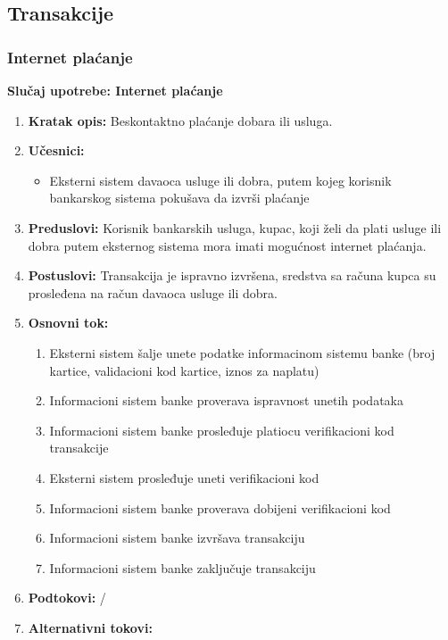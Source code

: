 \documentclass{article}
\begin{document}
\subsection{Transakcije}
\subsubsection{Internet plaćanje}

\textbf{Slučaj upotrebe: Internet plaćanje}
\begin{enumerate}
  \item \textbf{Kratak opis: }
  Beskontaktno plaćanje dobara ili usluga.
  \item \textbf{Učesnici: }
    \begin{itemize}
        \item Eksterni sistem davaoca usluge ili dobra, putem kojeg korisnik bankarskog sistema pokušava da izvrši plaćanje
     \end{itemize}
  \item \textbf{Preduslovi: }
    Korisnik bankarskih usluga, kupac, koji želi da plati usluge ili dobra putem eksternog sistema mora imati mogućnost internet plaćanja. 
  \item \textbf{Postuslovi: }
    Transakcija je ispravno izvršena, sredstva sa računa kupca su prosleđena na račun davaoca usluge ili dobra.
  \item \textbf{Osnovni tok: }
    \begin{enumerate}
      \item Eksterni sistem šalje unete podatke informacinom sistemu banke (broj kartice, validacioni kod kartice, iznos za naplatu)
      \item Informacioni sistem banke proverava ispravnost unetih podataka
      \item Informacioni sistem banke prosleđuje platiocu verifikacioni kod transakcije  
      \item Eksterni sistem prosleđuje uneti verifikacioni kod
      \item Informacioni sistem banke proverava dobijeni verifikacioni kod  
      \item Informacioni sistem banke izvršava transakciju 
      \item Informacioni sistem banke zaključuje transakciju
    \end{enumerate}
  \item \textbf{Podtokovi: } /
  \item \textbf{Alternativni tokovi: } 
  \begin{enumerate}

\end{enumerate}
\end{enumerate}
\end{document}

